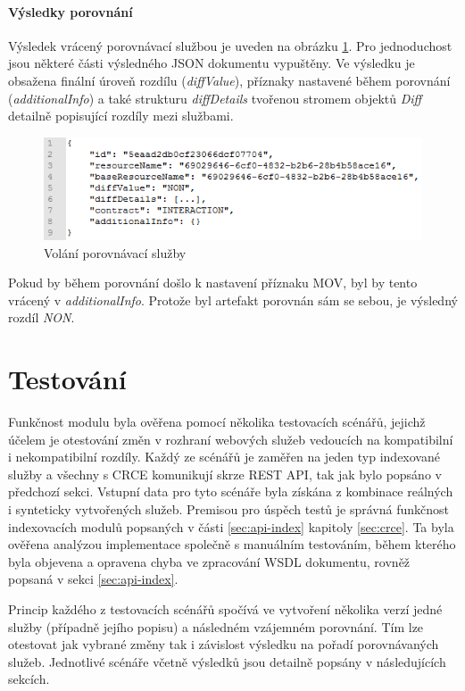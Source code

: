 \documentclass[czech,DP]{thesiskiv}
\begin{document}
\paragraph{Výsledky porovnání}
Výsledek vrácený porovnávací službou je uveden na obrázku \ref{fig:apicomp-res}. Pro jednoduchost jsou některé části výsledného JSON dokumentu vypuštěny. Ve výsledku je obsažena finální úroveň rozdílu (\textit{diffValue}), příznaky nastavené během porovnání (\textit{additionalInfo}) a také strukturu \textit{diffDetails} tvořenou stromem objektů \textit{Diff} detailně popisující rozdíly mezi službami.

\begin{figure}[h]
	\centering
	\includegraphics[width=\linewidth]{apicomp-res.png}
	\caption{Volání porovnávací služby}
	\label{fig:apicomp-res}
\end{figure}

Pokud by během porovnání došlo k nastavení příznaku MOV, byl by tento vrácený v \textit{additionalInfo}. Protože byl artefakt porovnán sám se sebou, je výsledný rozdíl \textit{NON}.

\section{Testování}

Funkčnost modulu byla ověřena pomocí několika testovacích scénářů, jejichž účelem je otestování změn v rozhraní webových služeb vedoucích na kompatibilní i nekompatibilní rozdíly. Každý ze scénářů je zaměřen na jeden typ indexované služby a všechny s CRCE komunikují skrze REST API, tak jak bylo popsáno v předchozí sekci. Vstupní data pro tyto scénáře byla získána z kombinace reálných i synteticky vytvořených služeb. Premisou pro úspěch testů je správná funkčnost indexovacích modulů popsaných v části \ref{sec:api-index} kapitoly \ref{sec:crce}. Ta byla ověřena analýzou implementace společně s manuálním testováním, během kterého byla objevena a opravena chyba ve zpracování WSDL dokumentu, rovněž popsaná v sekci \ref{sec:api-index}.

Princip každého z testovacích scénářů spočívá ve vytvoření několika verzí jedné služby (případně jejího popisu) a následném vzájemném porovnání. Tím lze otestovat jak vybrané změny tak i závislost výsledku na pořadí porovnávaných služeb. Jednotlivé scénáře včetně výsledků jsou detailně popsány v následujících sekcích.
\end{document}
